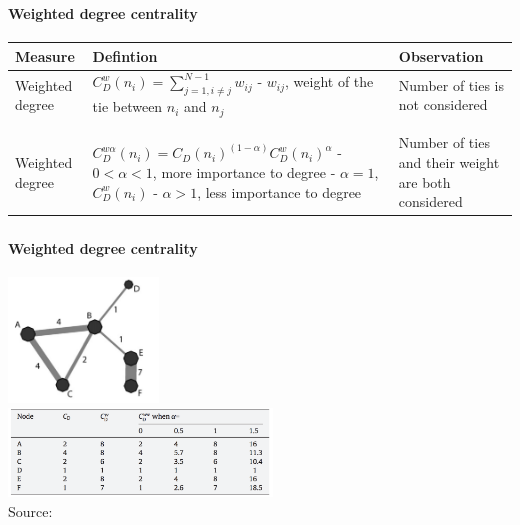 \documentclass[8pt]{beamer}
\begin{document}

\begin{frame}
\frametitle{\insertsection}
\framesubtitle{Weighted degree centrality}

\scriptsize
\begin{table}
\begin{tabular}{p{2cm}p{6.5cm}p{2cm}}
\toprule
\textbf{Measure} & \textbf{Defintion} & \textbf{Observation}\\
\midrule
Weighted \newline degree\newline\cite{Barrat2004} & 
$C_D^w(n_i) = \sum_{j=1, i \neq j}^{N-1}{w_{ij}}$\newline
\newline
\newline
- $w_{ij}$, weight of the tie between $n_i$ and $n_j$& 
Number of ties is not considered\\
\\
\hline
\\
Weighted \newline degree\newline\cite{Opsahl2010} & 
$C_D^{w\alpha}(n_i) = C_D(n_i)^{(1-\alpha)}C_D^w(n_i)^\alpha$\newline
\newline
\newline
- $0<\alpha<1$, more importance to degree\newline
- $\alpha=1$, $C_D^w(n_i)$\newline
- $\alpha>1$, less importance to degree&
Number of ties and their weight are both considered\\
\bottomrule
\end{tabular}
\end{table}

\end{frame}


\begin{frame}
\frametitle{\insertsection}
\framesubtitle{Weighted degree centrality}

\centering  
\includegraphics[width=4cm]{degreew2.png}\\
\medskip
\includegraphics[width=7cm]{degreew1.png}\\
\tiny Source: \cite{Opsahl2010}	

\end{frame}
\end{document}
